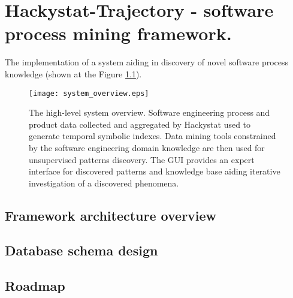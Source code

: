 \chapter{Hackystat-Trajectory - software process mining framework.} \label{trajectory}
The implementation of a system aiding in discovery of novel software process knowledge (shown at the Figure \ref{fig:system_overview}).

\begin{figure}[tbp]
   \centering
   \texttt{[image: system\_overview.eps]}
   \caption{The high-level system overview. Software engineering process and product data collected and aggregated by Hackystat used to generate temporal symbolic indexes. Data mining tools constrained by the software engineering domain knowledge are then used for unsupervised patterns discovery. The GUI provides an expert interface for discovered patterns and knowledge base aiding iterative investigation of a discovered phenomena.}
   \label{fig:system_overview}
\end{figure}

\section{Framework architecture overview}

\section{Database schema design}

\section{Roadmap}
